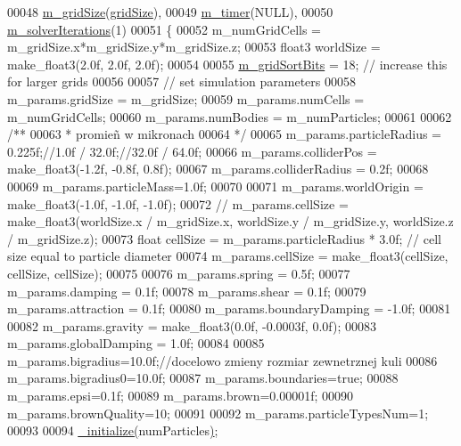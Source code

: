 \begin{DoxyCode}
00048     \hyperlink{class_particle_system_a8a2be3e93616aa694801369c8b8d12cb}{m\_gridSize}(\hyperlink{class_particle_system_a8a2be3e93616aa694801369c8b8d12cb}{gridSize}),
00049     \hyperlink{class_particle_system_a8a2be3e93616aa694801369c8b8d12cb}{m\_timer}(NULL),
00050     \hyperlink{class_particle_system_a7b4b053433c052518b8ecce1b02000f5}{m\_solverIterations}(1)
00051 \{
00052     m\_numGridCells = m\_gridSize.x*m\_gridSize.y*m\_gridSize.z;
00053     float3 worldSize = make\_float3(2.0f, 2.0f, 2.0f);
00054 
00055     \hyperlink{class_particle_system_a2a0452a32993337176d88fa2fbe63020}{m\_gridSortBits} = 18;    \textcolor{comment}{// increase this for larger grids}
00056 
00057     \textcolor{comment}{// set simulation parameters}
00058     m\_params.gridSize = m\_gridSize;
00059     m\_params.numCells = m\_numGridCells;
00060     m\_params.numBodies = m\_numParticles;
00061 
00062         \textcolor{comment}{/**}
00063 \textcolor{comment}{        * promieñ w mikronach}
00064 \textcolor{comment}{        */}
00065     m\_params.particleRadius = 0.225f;\textcolor{comment}{//1.0f / 32.0f;//32.0f / 64.0f;}
00066     m\_params.colliderPos = make\_float3(-1.2f, -0.8f, 0.8f);
00067     m\_params.colliderRadius = 0.2f;
00068 
00069         m\_params.particleMass=1.0f;
00070 
00071     m\_params.worldOrigin = make\_float3(-1.0f, -1.0f, -1.0f);
00072     \textcolor{comment}{//    m\_params.cellSize = make\_float3(worldSize.x / m\_gridSize.x, worldSize.y / m\_gridSize.y,
       worldSize.z / m\_gridSize.z);}
00073     \textcolor{keywordtype}{float} cellSize = m\_params.particleRadius * 3.0f;  \textcolor{comment}{// cell size equal to particle diameter}
00074     m\_params.cellSize = make\_float3(cellSize, cellSize, cellSize);
00075 
00076     m\_params.spring = 0.5f;
00077     m\_params.damping = 0.1f;
00078     m\_params.shear = 0.1f;
00079     m\_params.attraction = 0.1f;
00080     m\_params.boundaryDamping = -1.0f;
00081 
00082     m\_params.gravity = make\_float3(0.0f, -0.0003f, 0.0f);
00083     m\_params.globalDamping = 1.0f;
00084 
00085         m\_params.bigradius=10.0f;\textcolor{comment}{//docelowo zmieny rozmiar zewnetrznej kuli}
00086         m\_params.bigradius0=10.0f;
00087         m\_params.boundaries=\textcolor{keyword}{true};
00088         m\_params.epsi=0.1f;
00089         m\_params.brown=0.00001f;
00090         m\_params.brownQuality=10;
00091 
00092         m\_params.particleTypesNum=1;
00093 
00094     \hyperlink{class_particle_system_a484988642e046424d32a13709204e8de}{\_initialize}\hyperlink{class_particle_system_a484988642e046424d32a13709204e8de}{(}numParticles\hyperlink{class_particle_system_a484988642e046424d32a13709204e8de}{)};

\end{DoxyCode}
